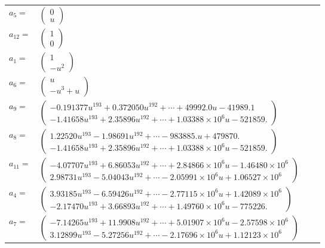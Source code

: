 \documentclass[1p]{elsarticle_modified}
\theoremstyle{definition}
\begin{document}
\begin{tabular}{m{7pt} m{180pt} m{7pt} m{180pt} }
\flushright $a_{5}=$&$\begin{pmatrix}0\\u\end{pmatrix}$ \\
\flushright $a_{12}=$&$\begin{pmatrix}1\\0\end{pmatrix}$ \\
\flushright $a_{1}=$&$\begin{pmatrix}1\\- u^2\end{pmatrix}$ \\
\flushright $a_{6}=$&$\begin{pmatrix}u\\- u^3+u\end{pmatrix}$ \\
\flushright $a_{9}=$&$\begin{pmatrix}-0.191377 u^{193}+0.372050 u^{192}+\cdots+49992.0 u-41989.1\\-1.41658 u^{193}+2.35896 u^{192}+\cdots+1.03388\times10^{6} u-521859.\end{pmatrix}$ \\
\flushright $a_{8}=$&$\begin{pmatrix}1.22520 u^{193}-1.98691 u^{192}+\cdots-983885. u+479870.\\-1.41658 u^{193}+2.35896 u^{192}+\cdots+1.03388\times10^{6} u-521859.\end{pmatrix}$ \\
\flushright $a_{11}=$&$\begin{pmatrix}-4.07707 u^{193}+6.86053 u^{192}+\cdots+2.84866\times10^{6} u-1.46480\times10^{6}\\2.98731 u^{193}-5.04043 u^{192}+\cdots-2.05991\times10^{6} u+1.06527\times10^{6}\end{pmatrix}$ \\
\flushright $a_{4}=$&$\begin{pmatrix}3.93185 u^{193}-6.59426 u^{192}+\cdots-2.77115\times10^{6} u+1.42089\times10^{6}\\-2.17470 u^{193}+3.66893 u^{192}+\cdots+1.49760\times10^{6} u-775226.\end{pmatrix}$ \\
\flushright $a_{7}=$&$\begin{pmatrix}-7.14265 u^{193}+11.9908 u^{192}+\cdots+5.01907\times10^{6} u-2.57598\times10^{6}\\3.12899 u^{193}-5.27256 u^{192}+\cdots-2.17696\times10^{6} u+1.12123\times10^{6}\end{pmatrix}$ \\

\end{tabular}
\end{document}
